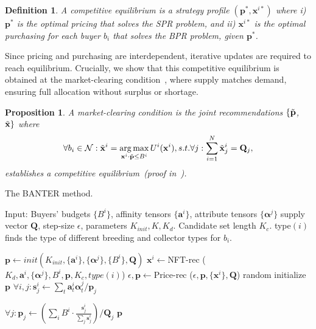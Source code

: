 \documentclass[conference]{IEEEtran}
\theoremstyle{plain}
\newtheorem{proposition}{Proposition}
\newtheorem{definition}{Definition}
\DeclareMathOperator*{\argmax}{arg\,max}
\begin{document}
\begin{definition}
\label{def:competitive_equilibrium}
    A competitive equilibrium is a strategy profile $(\mathbf{p}^*, {\mathbf{x}^{i*}})$ where i) $\mathbf{p}^*$ is the optimal pricing that solves the SPR problem, and ii) ${\mathbf{x}^{i*}}$ is the optimal purchasing for each buyer $b_i$ that solves the BPR problem, given $\mathbf{p}^*$.
\end{definition}

Since pricing and purchasing are interdependent, iterative updates are required to reach equilibrium. Crucially, we show that this competitive equilibrium is obtained at the market-clearing condition~\cite{raimondo2005market}, where supply matches demand, ensuring full allocation without surplus or shortage.

\begin{proposition}
\label{prop:equilibrium}
    A market-clearing condition is the joint recommendations $\{\Tilde{\mathbf{p}}$, $\Tilde{\mathbf{x}}\}$ where 
    \begin{equation}\small
    \label{eqn:equilibrium-solution}
        \forall b_i\in \mathcal{N}:\Tilde{\mathbf{x}}^i = \argmax_{\mathbf{x}^i\cdot \Tilde{\mathbf{p}}\leq B^i} U^i(\mathbf{x}^i) , s.t.  \forall j: \sum_{i=1}^N \Tilde{\mathbf{x}}^i_j = \mathbf{Q}_j,
    \end{equation}
    establishes a competitive equilibrium~(proof in~\cite{supplementary}).

\end{proposition}

\begin{algorithm}[t]
    \small
    \caption{The BANTER method.}
    \label{alg:method}
    Input: Buyers' budgets $\{B^i\}$, affinity tensors $\{\mathbf{a}^i\}$, attribute tensors $\{\bm{\alpha}^j\}$ supply vector $\mathbf{Q}$, step-size $\epsilon$, parameters $K_{init}, K, K_d$. Candidate set length $K_c$. type$(i)$ finds the type of different breeding and collector types for $b_i$.
    \begin{algorithmic}[1]
    \State $\mathbf{p}\gets init(K_{init}, \{\mathbf{a}^i\}, \{\bm{\alpha}^j\}, \{B^i\}, \mathbf{Q})$
            \State $\mathbf{x}^i\gets$NFT-rec ($K_{d}, \mathbf{a}^i, \{\bm{\alpha}^j\}, B^i, \mathbf{p}, K_c, type(i)$)
        \EndFor
        \State $\epsilon, \mathbf{p} \gets$Price-rec ($\epsilon, \mathbf{p}, \{\mathbf{x}^i\}, \mathbf{Q}$)
    \EndFor
        \State random initialize $\mathbf{p}$
            \State $\forall i, j: \mathbf{s}^i_j \gets \sum_t\mathbf{a}^i_t\bm{\alpha}^j_t/\mathbf{p}_j$

            \State 
            $\forall j: \mathbf{p}_j\gets \left(\sum_i B^i\cdot \frac{\mathbf{s}^i_j}{\sum_j \mathbf{s}^i_j}\right)/\mathbf{Q}_j$
        \EndFor
        \Return $\mathbf{p}$
    \EndProcedure
    \end{algorithmic}
\end{algorithm}
\end{document}
